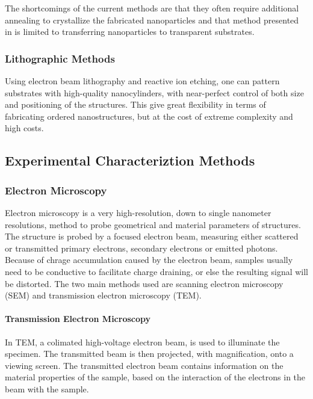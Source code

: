                 The shortcomings of the current methods are that they often require additional annealing to crystallize the fabricated nanoparticles and that
            method presented in \cite{zywietz2014laser} is limited to transferring nanoparticles to transparent substrates.

        \subsubsection{Lithographic Methods}
                Using electron beam lithography and reactive ion etching, one can pattern substrates with high-quality nanocylinders, with near-perfect
            control of both size and positioning of the structures\cite{bakker2015magnetic}. This give great flexibility in terms of fabricating ordered nanostructures, but at the
            cost of extreme complexity and high costs.

    \subsection{Experimental Characteriztion Methods}
        \subsubsection{Electron Microscopy}
        \label{sec:ElectronMicroscopy}
                Electron microscopy is a very high-resolution, down to single nanometer resolutions, method to probe geometrical and
            material parameters of structures. The structure is probed by a focused electron beam, measuring either scattered or transmitted
            primary electrons, secondary electrons or emitted photons. Because of chrage accumulation caused by the electron beam, samples
            usually need to be conductive to facilitate charge draining, or else the resulting signal will be distorted.
                The two main methods used are scanning electron microscopy (SEM) and transmission electron microscopy (TEM).

            \paragraph{Transmission Electron Microscopy}
                    In TEM, a colimated high-voltage electron beam, is used to illuminate the specimen. The transmitted beam is then projected,
                with magnification, onto a viewing screen. The transmitted electron beam contains information on the material properties of the
                sample, based on the interaction of the electrons in the beam with the sample.


